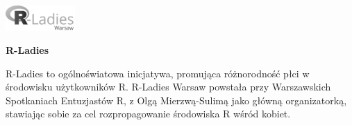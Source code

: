 \documentclass[\main/boa.tex]{subfiles}
\begin{document}
	
	\begin{minipage}[t]{0.915\textwidth}
		\center     
		\includegraphics[width=100px]{img/logos.bw/R-Ladies.png} 
	\end{minipage}
	
	\Large \textbf {R-Ladies}
	
	
	\vskip 0.3cm
	\normalsize 
	R-Ladies to ogólnoświatowa inicjatywa, promująca różnorodność płci w środowisku użytkowników R. R-Ladies Warsaw powstała przy Warszawskich Spotkaniach Entuzjastów R, z Olgą Mierzwą-Sulimą jako główną organizatorką, stawiając sobie za cel rozpropagowanie środowiska R wśród kobiet.
	
	\vskip 1.5cm
\end{document}
